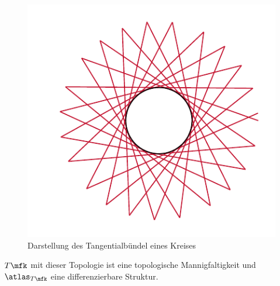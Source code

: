 \begin{figure}[H]
\centering
\includegraphics[scale=0.7]{figures/tikz/tangent_bundle.pdf}
\caption{Darstellung des Tangentialbündel eines Kreises}
\label{img:tangent_bundle}
\end{figure}

\begin{satz}
$T\mfk$ mit dieser Topologie ist eine topologische Mannigfaltigkeit und $\atlas_{T\mfk}$ eine differenzierbare Struktur.
\end{satz}
